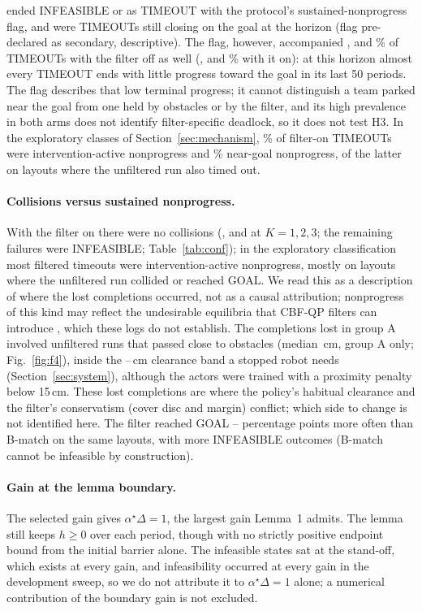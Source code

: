 \documentclass[11pt]{article}
\begin{document}
ended INFEASIBLE or as TIMEOUT with the protocol's sustained-nonprogress flag, and \HthreeMovingAll{} were TIMEOUTs
still closing on the goal at the horizon (flag pre-declared as secondary, descriptive). The flag,
however, accompanied \OffStallOfTOone, \OffStallOfTOtwo{} and \OffStallOfTOthree\% of TIMEOUTs with the
filter off as well (\OnStallOfTOone, \OnStallOfTOtwo{} and \OnStallOfTOthree\% with it on): at this
horizon almost every TIMEOUT ends with little progress toward the goal in its last 50 periods. The flag
describes that low terminal progress; it cannot distinguish a team parked near the goal from one held
by obstacles or by the filter, and its high prevalence in both arms does not identify filter-specific
deadlock, so it does not test H3. In the exploratory classes of Section~\ref{sec:mechanism}, \TOfiPct\% of
filter-on TIMEOUTs were intervention-active nonprogress and \TOngPct\% near-goal nonprogress, \TOngOffTO{}
of the latter on layouts where the unfiltered run also timed out.

\paragraph{Collisions versus sustained nonprogress.} With the filter on there were no collisions (\CollOnone,
\CollOntwo{} and \CollOnthree{} at $K=1,2,3$; the remaining failures were INFEASIBLE;
Table~\ref{tab:conf}); in the exploratory classification most filtered timeouts were
intervention-active nonprogress, mostly on layouts where the unfiltered run collided or reached GOAL. We read
this as a description of where the lost completions occurred, not as a causal attribution; nonprogress of
this kind may reflect the undesirable equilibria that CBF-QP filters can introduce \cite{reis2021}, which
these logs do not establish. The completions lost in group A involved unfiltered runs that passed close to obstacles
(median \GapAmedCm\,cm, group A only; Fig.~\ref{fig:f4}), inside the \CoverBandLoCm--\CoverBandHiCm\,cm
clearance band a stopped robot needs (Section~\ref{sec:system}), although the actors were trained with a
proximity penalty below 15\,cm. These lost completions are where the policy's habitual clearance and the
filter's conservatism (cover disc and margin) conflict; which side to change is not identified here.
The filter reached GOAL \OnBmGoalMin--\OnBmGoalMax{} percentage points more often than B-match on the
same layouts, with more INFEASIBLE outcomes (B-match cannot be infeasible by construction).

\paragraph{Gain at the lemma boundary.} The selected gain gives $\alpha^\star\Delta=1$, the largest gain
Lemma~1 admits. The lemma still keeps $h\ge0$ over each period, though with no strictly positive
endpoint bound from the initial barrier alone. The infeasible states sat at the stand-off, which exists
at every gain, and infeasibility occurred at every gain in the development sweep, so we do not attribute
it to $\alpha^\star\Delta=1$ alone; a numerical contribution of the boundary gain is not excluded.
\end{document}
